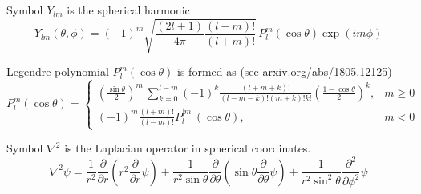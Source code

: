 Symbol $Y_{lm}$ is the spherical harmonic
\begin{equation*}
Y_{lm}(\theta,\phi)=(-1)^m
\sqrt{\frac{(2l+1)}{4\pi}
\frac{(l-m)!}{(l+m)!}}\,
P_l^m(\cos\theta)\exp(im\phi)
\end{equation*}

Legendre polynomial $P_l^m(\cos\theta)$ is formed as (see arxiv.org/abs/1805.12125)
\begin{equation*}
P_l^m(\cos\theta)=\begin{cases}
\displaystyle
\left(\frac{\sin\theta}{2}\right)^m\,\sum_{k=0}^{l-m}
(-1)^k\frac{(l+m+k)!}{(l-m-k)!(m+k)!k!}
\left(\frac{1-\cos\theta}{2}\right)^k, & m\ge0
\\[4ex]
\displaystyle
(-1)^m\frac{(l+m)!}{(l-m)!}P_l^{|m|}(\cos\theta), & m<0
\end{cases}
\end{equation*}

Symbol $\nabla^2$ is the Laplacian operator in spherical coordinates.
\begin{equation*}
\nabla^2\psi=\frac{1}{r^2}\frac{\partial}{\partial r}
\left(r^2\frac{\partial}{\partial r}\psi\right)
+
\frac{1}{r^2\sin\theta}\frac{\partial}{\partial\theta}
\left(\sin\theta\frac{\partial}{\partial\theta}\psi\right)
+
\frac{1}{r^2\sin^2\theta}\frac{\partial^2}{\partial\phi^2}\psi
\end{equation*}


